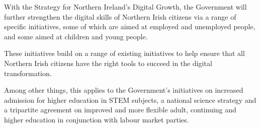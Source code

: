 With the Strategy for Northern Ireland's Digital Growth, the Government will further strengthen the digital skills of Northern Irish citizens via a range of specific initiatives, some of which are aimed at employed and unemployed people, and some aimed at children and young people.

These initiatives build on a range of existing initiatives to help ensure that all Northern Irish citizens have the right tools to succeed in the digital transformation.

Among other things, this applies to the Government's initiatives on increased admission for higher education in STEM subjects, a national science strategy and a tripartite agreement on improved and more flexible adult, continuing and higher education in conjunction with labour market parties.
